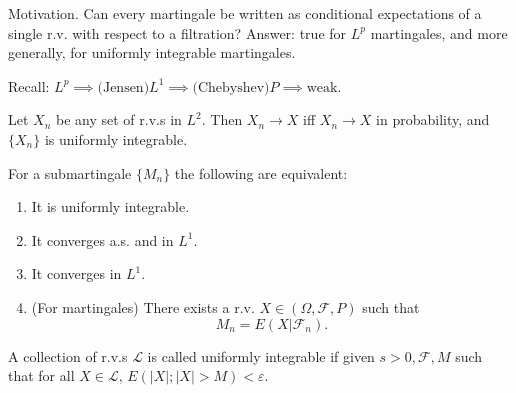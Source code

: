 
Motivation. Can every martingale be written as conditional expectations of a single r.v. with respect to a filtration? Answer: true for $L^p$ martingales, and more generally, for uniformly integrable martingales.

Recall: $L^p \implies \text{(Jensen)} L^1 \implies\text{(Chebyshev)} P \implies \text{weak}$.

\begin{theorem}
	Let $X_n$ be any set of r.v.s in $L^2$. Then $X_n \to X$ iff $X_n \to X$ in probability, and $\{X_n\} $ is uniformly integrable.
\end{theorem}

\begin{theorem}
	For a submartingale $\{M_n\} $ the following are equivalent:
	\begin{enumerate}
		\item It is uniformly integrable.
		\item It converges a.s. and in  $L^1$.
		\item It converges in $L^1$.
		\item (For martingales) There exists a r.v. $X \in (\Omega, \mathcal{F}, P)$ such that
			\[
				M_n = E(X | \mathcal{F}_n)
			.\] 
	\end{enumerate}
\end{theorem}
\begin{definition}
	A collection of r.v.s $\mathcal{L}$ is called uniformly integrable if given $s > 0, \mathcal{F}, M$ such that for all $X \in \mathcal{L}$, $E(|X|; |X| > M) < \varepsilon$.
\end{definition}

